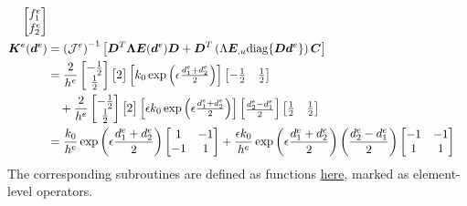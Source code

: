 \begin{equation}
\begin{aligned}
        \begin{bmatrix} f_1^e \\ f_2^e \end{bmatrix} \\
    \bm{K}^e(\bm{d}^e) &= {(\mathcal{J}^e)}^{-1} \left[ \bm{D}^T \bm{\Lambda} \bm{E}(\bm{d}^e) \bm{D} + \bm{D}^T \left( \Lambda \bm{E}_{,u} \textrm{diag}\{\bm{D} \bm{d}^e\} \right) \bm{C} \right] \\
    &=  \frac{2}{h^e} 
        \begin{bmatrix} -\frac{1}{2} \\ \frac{1}{2} \end{bmatrix} 
        \begin{bmatrix} 2 \end{bmatrix} 
        \begin{bmatrix} k_0 \exp \left(\epsilon \frac{d_1^e + d_2^e}{2}\right) \end{bmatrix} 
        \begin{bmatrix} -\frac{1}{2} & \frac{1}{2} \end{bmatrix} \\
    &~~~+\frac{2}{h^e} 
        \begin{bmatrix} -\frac{1}{2} \\ \frac{1}{2} \end{bmatrix} 
        \begin{bmatrix} 2 \end{bmatrix} 
        \begin{bmatrix} \epsilon k_0 \exp \left(\epsilon \frac{d_1^e + d_2^e}{2}\right) \end{bmatrix} 
        \begin{bmatrix} \frac{d_2^e - d_1^e}{2} \end{bmatrix} 
        \begin{bmatrix} \frac{1}{2} & \frac{1}{2} \end{bmatrix} \\
    &=  \frac{k_0}{h^e} \exp \left(\epsilon \frac{d_1^e + d_2^e}{2}\right) 
        \begin{bmatrix} 1 & -1 \\ -1 & 1 \end{bmatrix} 
        + \frac{\epsilon k_0}{h^e}
        \exp \left(\epsilon \frac{d_1^e + d_2^e}{2}\right)
        \left(\frac{d_2^e - d_1^e}{2}\right)
        \begin{bmatrix} -1 & -1 \\ 1 & 1 \end{bmatrix} 
\end{aligned}
\end{equation}
The corresponding subroutines are defined as functions \href{https://github.com/sy-cui/CSE552-FA2024/blob/120296d43127bbe4347b004817ec7e08a5671894/homework/hw2/hw2.m}{here}, marked as element-level operators.

